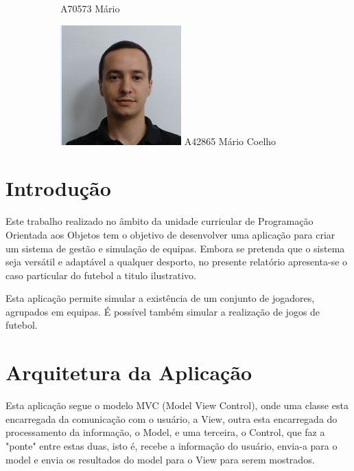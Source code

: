 \documentclass[11pt]{article}
\begin{document}
\begin{figure}[h!]
\begin{subfigure}[h!]{0.3\linewidth}
		A70573 Mário
	\end{subfigure}%
	\begin{subfigure}[h!]{0.3\linewidth}
		\centering
		\includegraphics[width=\linewidth]{MC.jpeg}
		A42865 Mário Coelho
	\end{subfigure}
\end{figure}


\section{Introdução}
Este trabalho realizado no âmbito da unidade curricular de Programação Orientada aos Objetos tem o objetivo de desenvolver uma aplicação para criar um sistema de gestão e simulação de equipas. Embora se pretenda que o sistema seja versátil e adaptável a qualquer desporto, no presente relatório apresenta-se o caso particular do futebol a titulo ilustrativo.

Esta aplicação permite simular a existência de um conjunto de jogadores, agrupados em equipas. É possível também simular a realização de jogos de futebol.

\section{Arquitetura da Aplicação}
Esta aplicação segue o modelo MVC (Model View Control), onde uma classe esta encarregada da comunicação com o usuário, a View, outra esta encarregada do processamento da informação, o Model, e uma terceira, o Control, que faz a "ponte" entre estas duas, isto é, recebe a informação do usuário, envia-a para o model e envia os resultados do model para o View para serem mostrados.
\end{document}
